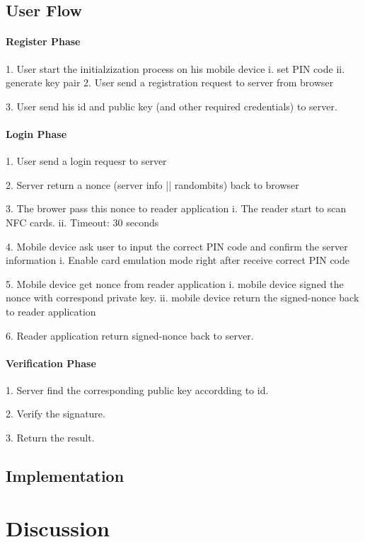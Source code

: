 \begin{CJK}{Bg5}{bsmi}
\section{User Flow}

\subsubsection{Register Phase}

	1. 	User start the initialzization process on his mobile device
		i.  set PIN code
		ii. generate key pair
	2.	User send a registration request to server from browser

	3.	User send his id and public key (and other required credentials) to server.

\subsubsection{Login Phase}

	1. User send a login requesr to server

	2. Server return a nonce ({server info || randombits}) back to browser

	3. The brower pass this nonce to reader application
		i.	The reader start to scan NFC cards.
		ii.	Timeout: 30 seconds

	4. Mobile device ask user to input the correct PIN code and confirm the server information
		i.	Enable card emulation mode right after receive correct PIN code

	5. Mobile device get nonce from reader application
		i.	mobile device signed the nonce with correspond private key.
		ii.	mobile device return the signed-nonce back to reader application

	6. Reader application return signed-nonce back to server.

\subsubsection{Verification Phase}

	1. Server find the corresponding public key accordding to id.

	2. Verify the signature.

	3. Return the result.

\section{Implementation}

\chapter{Discussion}


\end{CJK}
